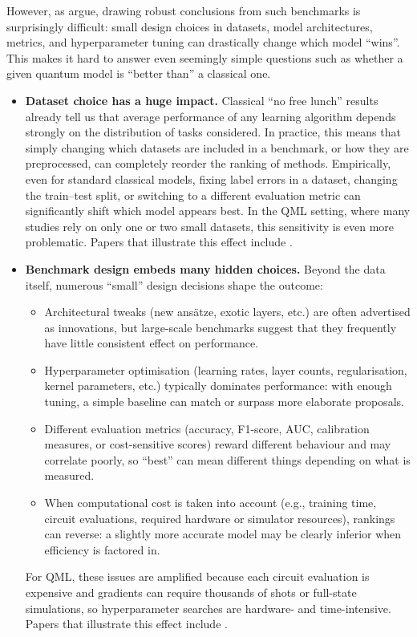 \documentclass[12pt,a4paper,openany]{report}
\let\parencite\citep
\let\textcite\citet
\begin{document}
However, as \textcite{bowles2024better} argue, drawing robust conclusions from such benchmarks is surprisingly difficult: small design choices in datasets, model architectures, metrics, and hyperparameter tuning can drastically change which model ``wins''. This makes it hard to answer even seemingly simple questions such as whether a given quantum model is ``better than'' a classical one.

\begin{itemize}
  \item \textbf{Dataset choice has a huge impact.}  
  Classical ``no free lunch'' results already tell us that average performance of any learning algorithm depends strongly on the distribution of tasks considered. In practice, this means that simply changing which datasets are included in a benchmark, or how they are preprocessed, can completely reorder the ranking of methods. Empirically, even for standard classical models, fixing label errors in a dataset, changing the train--test split, or switching to a different evaluation metric can significantly shift which model appears best. In the QML setting, where many studies rely on only one or two small datasets, this sensitivity is even more problematic. Papers that illustrate this effect include
\parencite{dehghani2021benchmarklottery,northcutt2021pervasive,recht2018cifar10,recht2019imagenet}.

  
  \item \textbf{Benchmark design embeds many hidden choices.}  
  Beyond the data itself, numerous ``small'' design decisions shape the outcome:
  \begin{itemize}
    \item Architectural tweaks (new ansätze, exotic layers, etc.) are often advertised as innovations, but large-scale benchmarks suggest that they frequently have little consistent effect on performance.
    \item Hyperparameter optimisation (learning rates, layer counts, regularisation, kernel parameters, etc.) typically dominates performance: with enough tuning, a simple baseline can match or surpass more elaborate proposals.
    \item Different evaluation metrics (accuracy, F1-score, AUC, calibration measures, or cost-sensitive scores) reward different behaviour and may correlate poorly, so ``best'' can mean different things depending on what is measured.
    \item When computational cost is taken into account (e.g., training time, circuit evaluations, required hardware or simulator resources), rankings can reverse: a slightly more accurate model may be clearly inferior when efficiency is factored in.
  \end{itemize}
  For QML, these issues are amplified because each circuit evaluation is expensive and gradients can require thousands of shots or full-state simulations, so hyperparameter searches are hardware- and time-intensive. Papers that illustrate this effect include
\parencite{narang2021transformer,smith2023convnets,lucic2018gans,henderson2018deeprlmatters,riquelme2018deepbayesianbandits,dodge2019showyourwork}.


\end{itemize}
\end{document}
